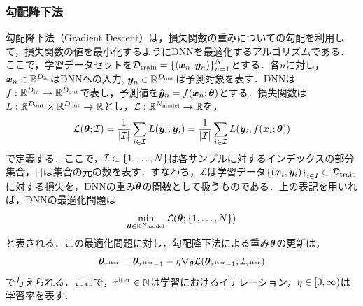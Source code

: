 \documentclass[12pt]{jarticle}
\numberwithin{equation}{section}    %
\numberwithin{figure}{section}      %
\numberwithin{table}{section}      %
\begin{document}
\subsubsection{勾配降下法}
\label{sec3:sec:gradient_descent}
勾配降下法（Gradient Descent）は，損失関数の重みについての勾配を利用して，損失関数の値を最小化するようにDNNを最適化するアルゴリズムである．ここで，学習データセットを$\mathcal{D}_{\text{train}} = \left\{(\bm{x}_{n}, \bm{y}_{n})\right\}_{n = 1}^{N}$とする．各$n$に対し，$\bm{x}_{n} \in \mathbb{R}^{D_{\text{in}}}$はDNNへの入力, $\bm{y}_{n} \in \mathbb{R}^{D_{\text{out}}}$は予測対象を表す．DNNは$f: \mathbb{R}^{D_{\text{in}}} \to \mathbb{R}^{D_{\text{out}}}$で表し，予測値を$\hat{\bm{y}}_{n} = f(\bm{x}_{n}; \bm{\theta})$とする．損失関数は$L: \mathbb{R}^{D_{\text{out}}} \times \mathbb{R}^{D_{\text{out}}} \to \mathbb{R}$とし，$\mathcal{L}: \mathbb{R}^{N_{\text{model}}} \to \mathbb{R}$を，
\begin{equation}
    \mathcal{L}(\bm{\theta}; \mathcal{I}) = \frac{1}{|\mathcal{I}|} \sum_{i \in \mathcal{I}} L(\bm{y}_{i}, \hat{\bm{y}}_{i}) = \frac{1}{|\mathcal{I}|} \sum_{i \in \mathcal{I}} L(\bm{y}_{i}, f(\bm{x}_{i}; \bm{\theta}))
\end{equation}
で定義する．ここで，$\mathcal{I} \subset \{1, \ldots, N\}$は各サンプルに対するインデックスの部分集合，$|\cdot|$は集合の元の数を表す．すなわち，$\mathcal{L}$は学習データ$\left\{(\bm{x}_{i}, \bm{y}_{i})\right\}_{i \in I} \subset \mathcal{D}_{\text{train}}$に対する損失を，DNNの重み$\bm{\theta}$の関数として扱うものである．上の表記を用いれば，DNNの最適化問題は
\begin{equation}
    \min_{\bm{\theta} \in \mathbb{R}^{N_{\text{model}}}} \mathcal{L}(\bm{\theta}; \{1, \ldots, N\})
\end{equation}
と表される．この最適化問題に対し，勾配降下法による重み$\bm{\theta}$の更新は，
\begin{equation}
    \label{sec3:eq:normal_gradient_descent}
    \bm{\theta}_{\tau^{\text{iter}}} = \bm{\theta}_{\tau^{\text{iter}} - 1} - \eta \nabla_{\bm{\theta}} \mathcal{L}(\bm{\theta}_{\tau^{\text{iter}} - 1}; \mathcal{I}_{\tau^{\text{iter}}})
\end{equation}
で与えられる．ここで，$\tau^{\text{iter}} \in \mathbb{N}$は学習におけるイテレーション，$\eta \in [0, \infty)$は学習率を表す．
\end{document}
